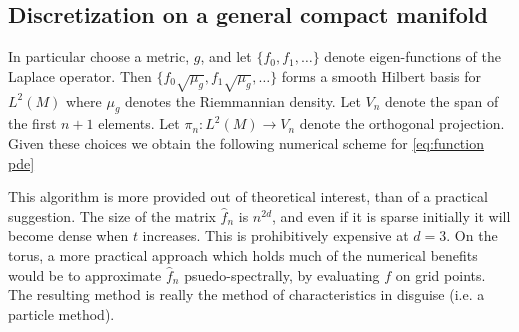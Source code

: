 \documentclass[12pt]{amsart}
\begin{document}
\subsection{Discretization on a general compact manifold}
In particular choose a metric, $g$, and let $\{ f_{0}, f_{1},\dots \}$ denote  eigen-functions of the Laplace operator.
Then $\{ f_{0} \sqrt{\mu_{g}} , f_{1} \sqrt{\mu_{g}} , \dots \}$ forms a smooth Hilbert basis for $L^{2}(M)$ where $\mu_{g}$ denotes the Riemmannian density.
Let $V_{n}$ denote the span of the first $n+1$ elements.
Let $\pi_{n}:L^{2}(M) \to V_{n}$ denote the orthogonal projection. 
Given these choices we obtain the following numerical scheme for \eqref{eq:function pde}

\begin{center}
\end{center}

This algorithm is more provided out of theoretical interest, than of a practical suggestion.
The size of the matrix $\hat{f}_{n}$ is $n^{2d}$, and even if it is sparse initially it will become dense when $t$ increases.
This is prohibitively expensive at $d = 3$.
On the torus, a more practical approach which holds much of the numerical benefits would be to approximate $\hat{f}_{n}$ psuedo-spectrally,
by evaluating $f$ on grid points.
The resulting method is really the method of characteristics in disguise (i.e. a particle method).
\end{document}
